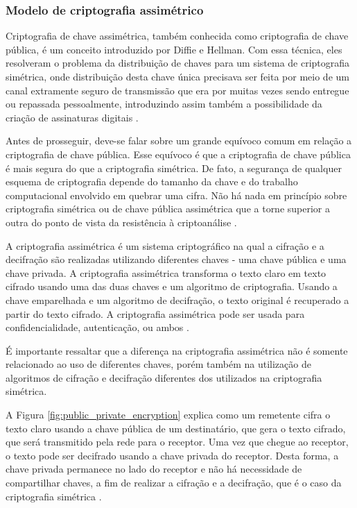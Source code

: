             
        \subsubsection{Modelo de criptografia assimétrico}
        
                Criptografia de chave assimétrica, também conhecida como criptografia de chave pública, é um conceito introduzido por Diffie e Hellman. Com essa técnica, eles resolveram o problema da distribuição de chaves para um sistema de criptografia simétrica, onde  distribuição desta chave única precisava ser feita por meio de um canal extramente seguro de transmissão que era por muitas vezes sendo entregue ou repassada pessoalmente, introduzindo assim também a possibilidade da criação de assinaturas digitais \cite{beginnig_blockchain_bikramaditya}.
                
                Antes de prosseguir, deve-se falar sobre um grande equívoco comum em relação a criptografia de chave pública. Esse equívoco é que a criptografia de chave pública é mais segura do que a criptografia simétrica. De fato, a segurança de qualquer esquema de criptografia depende do tamanho da chave e do trabalho computacional envolvido em quebrar uma cifra. Não há nada em princípio sobre criptografia simétrica ou de chave pública assimétrica que a torne superior a outra do ponto de vista da resistência à criptoanálise  \cite{cryptograpy_and_network_stallings}.

                A criptografia assimétrica é um sistema criptográfico na qual a cifração e a decifração são realizadas utilizando diferentes chaves - uma chave pública e uma chave privada. A criptografia assimétrica transforma o texto claro em texto cifrado usando uma das duas chaves e um algoritmo de criptografia. Usando a chave emparelhada e um algoritmo de decifração, o texto original é recuperado a partir do texto cifrado. A criptografia assimétrica pode ser usada para confidencialidade, autenticação, ou ambos \cite{cryptograpy_and_network_stallings}. 

		É importante ressaltar que a diferença na criptografia assimétrica não é somente relacionado ao uso de diferentes chaves, porém também na utilização de algoritmos de cifração e decifração diferentes dos utilizados na criptografia simétrica.

                A Figura \ref{fig:public_private_encryption} explica como um remetente cifra o texto claro usando a chave pública de um destinatário, que gera o texto cifrado, que será transmitido pela rede para o receptor. Uma vez que chegue ao receptor, o texto pode ser decifrado usando a chave privada do receptor. Desta forma, a chave privada permanece no lado do receptor e não há necessidade de compartilhar chaves, a fim de realizar a cifração e a decifração, que é o caso da criptografia simétrica \cite{mastering_blockchain}.

